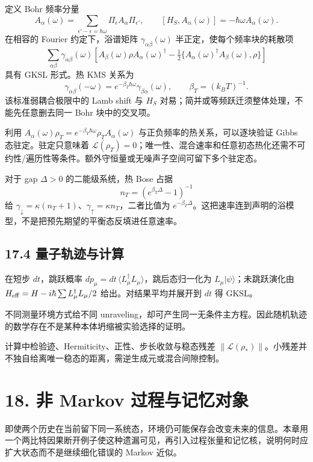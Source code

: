 \documentclass[
  11pt,
  oneside]{book}
\begin{document}
定义 Bohr 频率分量 \[
A_\alpha(\omega)=
\sum_{\epsilon'-\epsilon=\hbar\omega}
\Pi_\epsilon A_\alpha\Pi_{\epsilon'},
\qquad [H_S,A_\alpha(\omega)]=-\hbar\omega A_\alpha(\omega).
\] 在相容的 Fourier 约定下，浴谱矩阵 \(\gamma_{\alpha\beta}(\omega)\)
半正定，使每个频率块的耗散项 \[
\sum_{\alpha\beta}\gamma_{\alpha\beta}(\omega)
\left[A_\beta(\omega)\rho A_\alpha(\omega)^\dagger
-\tfrac12\{A_\alpha(\omega)^\dagger A_\beta(\omega),\rho\}\right]
\] 具有 GKSL 形式。热 KMS 关系为 \[
\gamma_{\alpha\beta}(-\omega)
=e^{-\beta_T\hbar\omega}\gamma_{\beta\alpha}(\omega),
\qquad \beta_T=(k_BT)^{-1}.
\] 该标准弱耦合极限中的 Lamb shift 与 \(H_S\)
对易；简并或等频跃迁须整体处理，不能先任意删去同一 Bohr 块中的交叉项。

利用
\(A_\alpha(\omega)\rho_T=e^{-\beta_T\hbar\omega}\rho_T A_\alpha(\omega)\)
与正负频率的热关系，可以逐块验证 Gibbs 态驻定。驻定只意味着
\(\mathcal L(\rho_T)=0\)；唯一性、混合速率和任意初态热化还需不可约性/遍历性等条件。额外守恒量或无噪声子空间可留下多个驻定态。

对于 gap \(\Delta>0\) 的二能级系统，热 Bose 占据 \[
n_T=(e^{\beta_T\Delta}-1)^{-1}
\] 给
\(\gamma_\downarrow=\kappa(n_T+1)\)、\(\gamma_\uparrow=\kappa n_T\)，二者比值为
\(e^{-\beta_T\Delta}\)。这把速率连到声明的浴模型，不是把预先期望的平衡态反填进任意速率。

\section{17.4 量子轨迹与计算}

在短步 \(dt\)，跳跃概率
\(dp_\mu=dt\,\langle L_\mu^\dagger L_\mu\rangle\)，跳后态归一化为
\(L_\mu|\psi\rangle\)；未跳跃演化由
\(H_{\rm eff}=H-i\hbar\sum L_\mu^\dagger L_\mu/2\)
给出。对结果平均并展开到 \(dt\) 得 GKSL。

不同测量环境方式给不同
unraveling，却可产生同一无条件主方程。因此随机轨迹的数学存在不是某种本体坍缩被实验选择的证明。

计算中检验迹、Hermiticity、正性、步长收敛与稳态残差
\(\|\mathcal L(\rho_*)\|\)。小残差并不独自给离唯一稳态的距离，需逆生成元或混合间隙控制。

\chapter{18. 非 Markov 过程与记忆对象}\label{ch-18}\hypertarget{ch-18}{}

即使两个历史在当前留下同一系统态，环境仍可能保存会改变未来的信息。本章用一个两比特因果断开例子使这种遗漏可见，再引入过程张量和记忆核，说明何时应扩大状态而不是继续细化错误的
Markov 近似。
\end{document}
